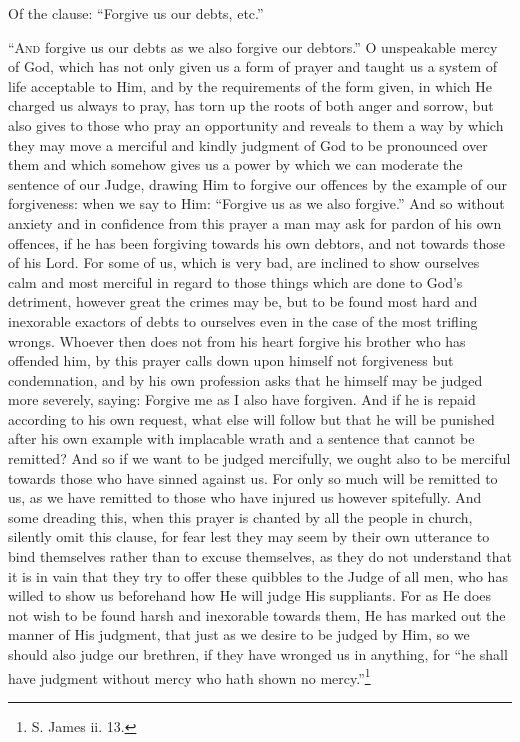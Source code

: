 
Of the clause: “Forgive us our debts, etc.”

“\textsc{And} forgive us our debts as we also forgive our debtors.” O unspeakable mercy of God, which has not only given us a form of prayer and taught us a system of life acceptable to Him, and by the requirements of the form given, in which He charged us always to pray, has torn up the roots of both anger and sorrow, but also gives to those who pray an opportunity and reveals to them a way by which they may move a merciful and kindly judgment of God to be pronounced over them and which somehow gives us a power by which we can moderate the sentence of our Judge, drawing Him to forgive our offences by the example of our forgiveness: when we say to Him: “Forgive us as we also forgive.” And so without anxiety and in confidence from this prayer a man may ask for pardon of his own offences, if he has been forgiving towards his own debtors, and not towards those of his Lord. For some of us, which is very bad, are inclined to show ourselves calm and most merciful in regard to those things which are done to God’s detriment, however great the crimes may be, but to be found most hard and inexorable exactors of debts to ourselves even in the case of the most trifling wrongs. Whoever then does not from his heart forgive his brother who has offended him, by this prayer calls down upon himself not forgiveness but condemnation, and by his own profession asks that he himself may be judged more severely, saying: Forgive me as I also have forgiven. And if he is repaid according to his own request, what else will follow but that he will be punished after his own example with implacable wrath and a sentence that cannot be remitted? And so if we want to be judged mercifully, we ought also to be merciful towards those who have sinned against us. For only so much will be remitted to us, as we have remitted to those who have injured us however spitefully. And some dreading this, when this prayer is chanted by all the people in church, silently omit this clause, for fear lest they may seem by their own utterance to bind themselves rather than to excuse themselves, as they do not understand that it is in vain that they try to offer these quibbles to the Judge of all men, who has willed to show us beforehand how He will judge His suppliants. For as He does not wish to be found harsh and inexorable towards them, He has marked out the manner of His judgment, that just as we desire to be judged by Him, so we should also judge our brethren, if they have wronged us in anything, for “he shall have judgment without mercy who hath shown no mercy.”\footnote{S. James ii. 13.}

